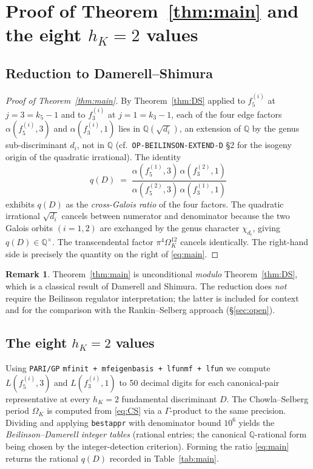 \documentclass[11pt,a4paper]{amsart}
\theoremstyle{plain}
\theoremstyle{definition}
\newtheorem{remark}[theorem]{Remark}
\newcommand{\Q}{\mathbb{Q}}
\begin{document}
\section{Proof of Theorem~\ref{thm:main} and the eight $h_K=2$ values}
\label{sec:proof}

\subsection{Reduction to Damerell--Shimura}

\begin{proof}[Proof of Theorem~\ref{thm:main}]
By Theorem~\ref{thm:DS} applied to $f_5^{(i)}$ at $j=3=k_5-1$ and to
$f_3^{(i)}$ at $j=1=k_3-1$, each of the four edge factors
$\alpha(f_5^{(i)},3)$ and $\alpha(f_3^{(i)},1)$ lies in $\Q(\sqrt{d_i})$,
an extension of $\Q$ by the genus sub-discriminant $d_i$, not in $\Q$
(cf.~\texttt{OP-BEILINSON-EXTEND-D} \S2 for the isogeny origin of the
quadratic irrational).  The identity
\[
  q(D)
  \;=\;
  \frac{\alpha(f_5^{(1)},3)\,\alpha(f_3^{(2)},1)}{\alpha(f_5^{(2)},3)\,\alpha(f_3^{(1)},1)}
\]
exhibits $q(D)$ as the \emph{cross-Galois ratio} of the four factors.
The quadratic irrational $\sqrt{d_i}$ cancels between numerator and
denominator because the two Galois orbits $(i=1,2)$ are exchanged by
the genus character $\chi_{d_i}$, giving $q(D)\in\Q^{\times}$.
The transcendental factor $\pi^{4}\Omega_K^{12}$ cancels identically.
The right-hand side is precisely the quantity on the right of
\eqref{eq:main}.
\end{proof}

\begin{remark}
Theorem~\ref{thm:main} is unconditional \emph{modulo} Theorem~\ref{thm:DS},
which is a classical result of Damerell and Shimura. The reduction does
\emph{not} require the Beilinson regulator interpretation; the latter is
included for context and for the comparison with the Rankin--Selberg
approach (\S\ref{sec:open}).
\end{remark}

\subsection{The eight $h_K=2$ values}

Using \texttt{PARI/GP} \texttt{mfinit + mfeigenbasis + lfunmf + lfun} we
compute $L(f_5^{(i)},3)$ and $L(f_3^{(i)},1)$ to 50 decimal digits for
each canonical-pair representative at every $h_K=2$ fundamental
discriminant $D$. The Chowla--Selberg period $\Omega_K$ is computed from
\eqref{eq:CS} via a $\Gamma$-product to the same precision. Dividing and
applying \texttt{bestappr} with denominator bound $10^6$ yields the
\emph{Beilinson--Damerell integer tables} (rational entries; the
canonical $\Q$-rational form being chosen by the integer-detection
criterion). Forming the ratio \eqref{eq:main} returns the rational
$q(D)$ recorded in Table~\ref{tab:main}.
\end{document}
